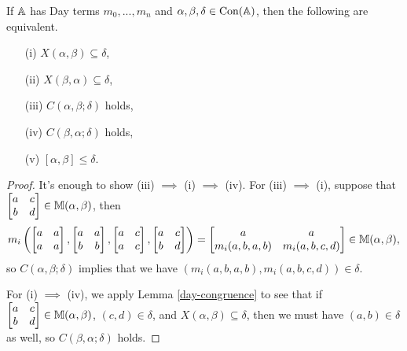 \documentclass[letterpaper,11pt]{article}
\DeclareMathOperator{\Con}{Con}
\begin{document}
\begin{thm}\label{day-commutator} If $\mathbb{A}$ has Day terms $m_0, ..., m_n$ and $\alpha,\beta,\delta \in \Con(\bA)$, then the following are equivalent.
\begin{itemize}
\item[(i)] $X(\alpha,\beta) \subseteq \delta$,

\item[(ii)] $X(\beta,\alpha) \subseteq \delta$,

\item[(iii)] $C(\alpha,\beta;\delta)$ holds,

\item[(iv)] $C(\beta,\alpha;\delta)$ holds,

\item[(v)] $[\alpha,\beta] \le \delta$.
\end{itemize}
\end{thm}
\begin{proof} It's enough to show (iii) $\implies$ (i) $\implies$ (iv). For (iii) $\implies$ (i), suppose that $\begin{bmatrix} a & c\\ b & d\end{bmatrix} \in \mathbb{M}(\alpha,\beta)$, then
\[
m_i\left(\begin{bmatrix} a & a\\ a & a\end{bmatrix}, \begin{bmatrix} a & a\\ b & b\end{bmatrix}, \begin{bmatrix} a & c\\ a & c\end{bmatrix}, \begin{bmatrix} a & c\\ b & d\end{bmatrix}\right) = \begin{bmatrix} a & a\\ m_i(a,b,a,b) & m_i(a,b,c,d)\end{bmatrix} \in \mathbb{M}(\alpha,\beta),
\]
so $C(\alpha,\beta;\delta)$ implies that we have $(m_i(a,b,a,b),m_i(a,b,c,d)) \in \delta$.

For (i) $\implies$ (iv), we apply Lemma \ref{day-congruence} to see that if $\begin{bmatrix} a & c\\ b & d\end{bmatrix} \in \mathbb{M}(\alpha,\beta)$, $(c,d) \in \delta$, and $X(\alpha,\beta) \subseteq \delta$, then we must have $(a,b) \in \delta$ as well, so $C(\beta,\alpha;\delta)$ holds.
\end{proof}
\end{document}
